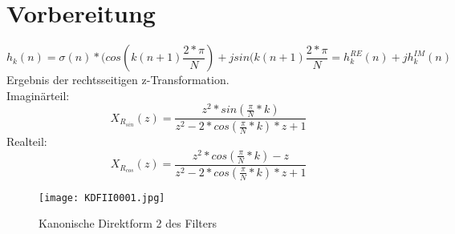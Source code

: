 \chapter{Vorbereitung}
\begin{equation}
  h_{k}(n)=\sigma(n)*(cos(k(n+1)\frac{2*\pi}{N})+jsin(k(n+1)\frac{2*\pi}{N}=h_{k}^{RE}(n)+jh_{k}^{IM}(n)
\end{equation}
Ergebnis der rechtsseitigen z-Transformation.\\
Imaginärteil:
\begin{equation}
  X_{R_{sin}}(z)= \frac{z^{2}*sin(\frac{\pi}{N}*k)}{z^{2}-2*cos(\frac{\pi}{N}*k)*z+1}
\end{equation}
Realteil:
\begin{equation}
  X_{R_{cos}}(z)=\frac{z^{2}*cos(\frac{\pi}{N}*k)-z}{z^{2}-2*cos(\frac{\pi}{N}*k)*z+1}
\end{equation}
\begin{figure}[H]
  \centering
    \texttt{[image: KDFII0001.jpg]}
  \caption{Kanonische Direktform 2 des Filters}
  \label{fig:KDFII}
\end{figure}